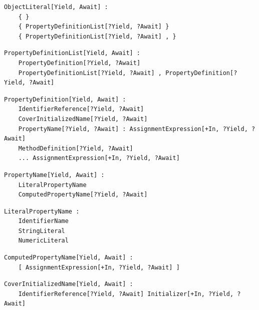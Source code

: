 \noindent\textbf{\texttt{}}\par
\begin{lstlisting}
ObjectLiteral[Yield, Await] :
    { }
    { PropertyDefinitionList[?Yield, ?Await] }
    { PropertyDefinitionList[?Yield, ?Await] , }
\end{lstlisting}

\noindent\textbf{\texttt{}}\par
\begin{lstlisting}
PropertyDefinitionList[Yield, Await] :
    PropertyDefinition[?Yield, ?Await]
    PropertyDefinitionList[?Yield, ?Await] , PropertyDefinition[?Yield, ?Await]
\end{lstlisting}

\noindent\textbf{\texttt{}}\par
\begin{lstlisting}
PropertyDefinition[Yield, Await] :
    IdentifierReference[?Yield, ?Await]
    CoverInitializedName[?Yield, ?Await]
    PropertyName[?Yield, ?Await] : AssignmentExpression[+In, ?Yield, ?Await]
    MethodDefinition[?Yield, ?Await]
    ... AssignmentExpression[+In, ?Yield, ?Await]
\end{lstlisting}

\noindent\textbf{\texttt{}}\par
\begin{lstlisting}
PropertyName[Yield, Await] :
    LiteralPropertyName
    ComputedPropertyName[?Yield, ?Await]
\end{lstlisting}

\noindent\textbf{\texttt{}}\par
\begin{lstlisting}
LiteralPropertyName :
    IdentifierName
    StringLiteral
    NumericLiteral
\end{lstlisting}

\noindent\textbf{\texttt{}}\par
\begin{lstlisting}
ComputedPropertyName[Yield, Await] :
    [ AssignmentExpression[+In, ?Yield, ?Await] ]
\end{lstlisting}

\noindent\textbf{\texttt{}}\par
\begin{lstlisting}
CoverInitializedName[Yield, Await] :
    IdentifierReference[?Yield, ?Await] Initializer[+In, ?Yield, ?Await]
\end{lstlisting}

